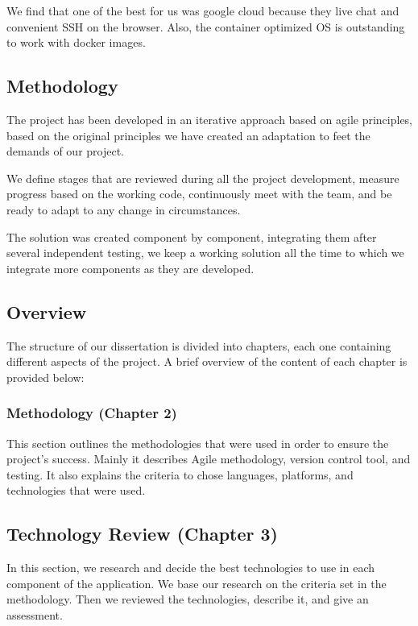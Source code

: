 We find that one of the best for us was google cloud because they live chat and convenient SSH on the browser.  Also, the container optimized OS is outstanding to work with docker images. 


\subsection{Methodology}
\vskip 0.1in
\indent
\indent
The project has been developed in an iterative approach based on agile principles, based on the original principles we have created an adaptation to feet the demands of our project.

We define stages that are reviewed during all the project development, measure progress based on the working code, continuously meet with the team, and be ready to adapt to any change in circumstances.

The solution was created component by component, integrating them after several independent testing, we keep a working solution all the time to which we integrate more components as they are developed.

\subsection{Overview}
\vskip 0.1in
\indent
\indent

The structure of our dissertation is divided into chapters, each one containing different aspects of the project. A brief overview of the content of each chapter is provided below:

\subsubsection{Methodology (Chapter 2)}
This section outlines the methodologies that were used in order to ensure the project's success.
Mainly it describes Agile methodology, version control tool, and testing.
It also explains the criteria to chose languages, platforms, and technologies that were used.


\subsection{Technology Review (Chapter 3)}

In this section, we research and decide the best technologies to use in each component of the application. We base our research on the criteria set in the methodology.  Then we reviewed the technologies, describe it, and give an assessment.

